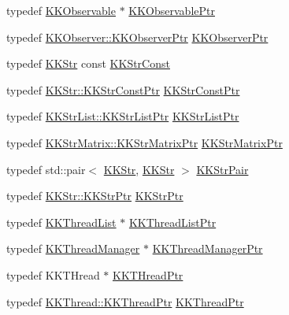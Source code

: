 \begin{DoxyCompactItemize}
\item 
typedef \hyperlink{class_k_k_b_1_1_k_k_observable}{K\+K\+Observable} $\ast$ \hyperlink{namespace_k_k_b_ad2874a3aec87b033137ef07aef832c93}{K\+K\+Observable\+Ptr}
\item 
typedef \hyperlink{class_k_k_b_1_1_k_k_observer_a68ab7a7c923a7f43d39542cd5264f231}{K\+K\+Observer\+::\+K\+K\+Observer\+Ptr} \hyperlink{namespace_k_k_b_ae230fa69820db86befff70da824c5b2b}{K\+K\+Observer\+Ptr}
\item 
typedef \hyperlink{class_k_k_b_1_1_k_k_str}{K\+K\+Str} const \hyperlink{namespace_k_k_b_a099e3e87bc82447b38ec025e33222cf5}{K\+K\+Str\+Const}
\item 
typedef \hyperlink{class_k_k_b_1_1_k_k_str_af0b636488a4f7497e5f65a576ccb55c8}{K\+K\+Str\+::\+K\+K\+Str\+Const\+Ptr} \hyperlink{namespace_k_k_b_a46f665ec17615c856eff3d21f78bed5c}{K\+K\+Str\+Const\+Ptr}
\item 
typedef \hyperlink{class_k_k_b_1_1_k_k_str_list_a466accb870aa75f4b47943932fccb4c8}{K\+K\+Str\+List\+::\+K\+K\+Str\+List\+Ptr} \hyperlink{namespace_k_k_b_a8f5f50672f37857425120831223888aa}{K\+K\+Str\+List\+Ptr}
\item 
typedef \hyperlink{class_k_k_b_1_1_k_k_str_matrix_ab4696a54a83ee47335ddb71ae77c64ff}{K\+K\+Str\+Matrix\+::\+K\+K\+Str\+Matrix\+Ptr} \hyperlink{namespace_k_k_b_a0645114c4d6ee02d11fa07d7d3407ee1}{K\+K\+Str\+Matrix\+Ptr}
\item 
typedef std\+::pair$<$ \hyperlink{class_k_k_b_1_1_k_k_str}{K\+K\+Str}, \hyperlink{class_k_k_b_1_1_k_k_str}{K\+K\+Str} $>$ \hyperlink{namespace_k_k_b_a19bc771df76ae3c010ce487b355b02b5}{K\+K\+Str\+Pair}
\item 
typedef \hyperlink{class_k_k_b_1_1_k_k_str_a00d1f5cb2d6cf913893365a11cb6057c}{K\+K\+Str\+::\+K\+K\+Str\+Ptr} \hyperlink{namespace_k_k_b_a9adbef5a6b3be0867f5570df2a08f388}{K\+K\+Str\+Ptr}
\item 
typedef \hyperlink{class_k_k_b_1_1_k_k_thread_list}{K\+K\+Thread\+List} $\ast$ \hyperlink{namespace_k_k_b_a959019686fca1d3421262b937e82867a}{K\+K\+Thread\+List\+Ptr}
\item 
typedef \hyperlink{class_k_k_b_1_1_k_k_thread_manager}{K\+K\+Thread\+Manager} $\ast$ \hyperlink{namespace_k_k_b_a9373d6bd6f2977b14e92c9e8e5ec4cdc}{K\+K\+Thread\+Manager\+Ptr}
\item 
typedef K\+K\+T\+Hread $\ast$ \hyperlink{namespace_k_k_b_a48df1bb0949527c9afc3535d86b8b138}{K\+K\+T\+Hread\+Ptr}
\item 
typedef \hyperlink{class_k_k_b_1_1_k_k_thread_ae0ca65f275a57c346e71486ad84b271a}{K\+K\+Thread\+::\+K\+K\+Thread\+Ptr} \hyperlink{namespace_k_k_b_a777246973c170048c5d7aca8a7df3e42}{K\+K\+Thread\+Ptr}

\end{DoxyCompactItemize}
